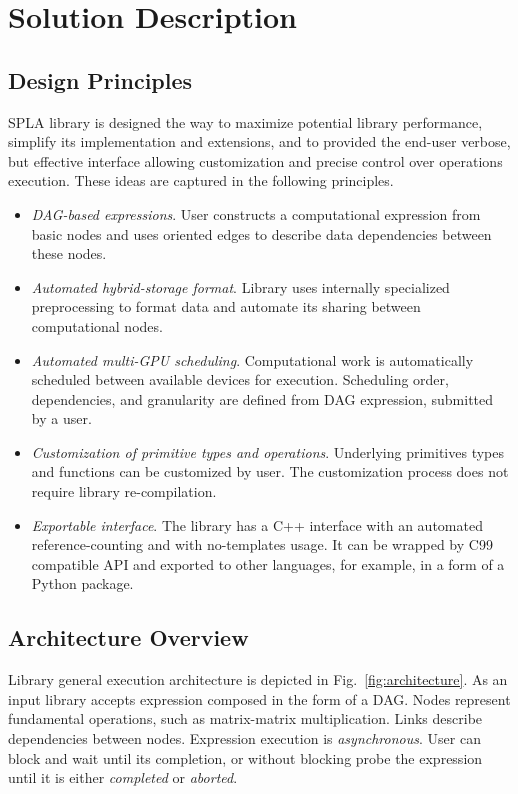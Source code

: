 \section{Solution Description}

\subsection{Design Principles}

SPLA library is designed the way to maximize potential library performance, simplify its implementation and extensions, and to provided the end-user verbose, but effective interface allowing customization and precise control over operations execution. These ideas are captured in the following principles.

\begin{itemize}
    \item \textit{DAG-based expressions}. User constructs a computational expression from basic nodes and uses oriented edges to describe data dependencies between these nodes. 
    \item \textit{Automated hybrid-storage format}. Library uses internally specialized preprocessing to format data and automate its sharing between computational nodes.
    \item \textit{Automated multi-GPU scheduling}. Computational work is automatically scheduled between available devices for execution. Scheduling order, dependencies, and granularity are defined from DAG expression, submitted by a user.
    \item \textit{Customization of primitive types and operations}. Underlying primitives types and functions can be customized by user. The customization process does not require library re-compilation. 
    \item \textit{Exportable interface}. The library has a C++ interface with an automated reference-counting and with no-templates usage. It can be wrapped by C99 compatible API and exported to other languages, for example, in a form of a Python package.
\end{itemize}

\subsection{Architecture Overview}

Library general execution architecture is depicted in Fig.~\ref{fig:architecture}. As an input library accepts expression composed in the form of a DAG.
Nodes represent fundamental operations, such as matrix-matrix multiplication. 
Links describe dependencies between nodes.
Expression execution is \textit{asynchronous}. 
User can block and wait until its completion, or without blocking probe the expression until it is either \textit{completed} or \textit{aborted}. 

